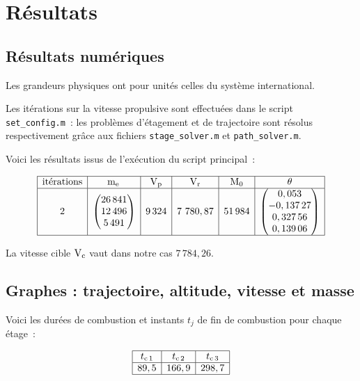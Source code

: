 \section{Résultats}

\subsection{Résultats numériques}

Les grandeurs physiques ont pour unités celles du système international.

Les itérations sur la vitesse propulsive sont effectuées dans le script \lstinline+set_config.m+~: les problèmes d'étagement et de trajectoire sont résolus respectivement grâce aux fichiers \lstinline+stage_solver.m+ et \lstinline+path_solver.m+.

Voici les résultats issus de l'exécution du script principal~:

\[\begin{array}{|c|c|c|c|c|c|}\hline
\text{itérations} & \masspropel{} & \propellingvlct & \realvlct & \mathrm{M}_0 & \theta\\ \hline
2 & \begin{pmatrix}26\,841\\ 12\,496\\ 5\,491\end{pmatrix} & 9\,324 & 7\ 780,87 & 51\,984 & %
\begin{pmatrix}0,053\\ -0,137\,27\\ 0,327\,56\\ 0,139\,06\end{pmatrix}\\\hline
\end{array}\]

La vitesse cible $\mathrm{V}_{\mathrm{c}}$ vaut dans notre cas $7\,784,26$.

\subsection{Graphes : trajectoire, altitude, vitesse et masse}

Voici les durées de combustion et instants $t_j$ de fin de combustion pour chaque étage~:

\[\begin{array}{|c|c|c|}\hline
t_{\mathrm{c}\,1} & t_{\mathrm{c}\,2} & t_{\mathrm{c}\,3}\\\hline
89,5 & 166,9 & 298,7\\\hline
\end{array}\]

